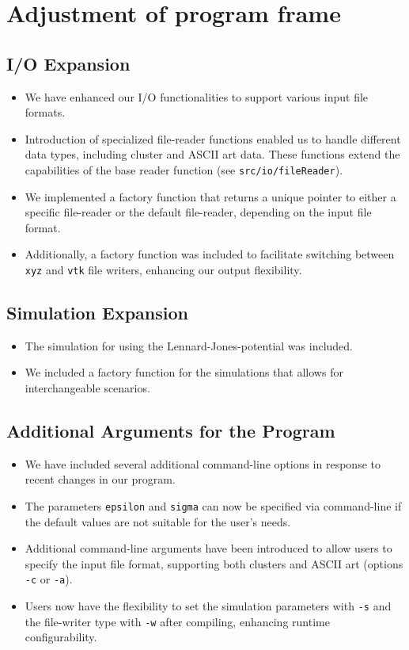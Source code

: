 \documentclass{article}
\begin{document}
\section{Adjustment of program frame}
\label{sec:adj}

\subsection{I/O Expansion}
\label{subsec:file}

\begin{itemize}
    \item We have enhanced our I/O functionalities to support various input file formats.
    \item Introduction of specialized file-reader functions enabled us to handle different data types, including cluster and ASCII art data. These functions extend the capabilities of the base reader function (see \texttt{src/io/fileReader}).
    \item We implemented a factory function that returns a unique pointer to either a specific file-reader or the default file-reader, depending on the input file format.
    \item Additionally, a factory function was included to facilitate switching between \texttt{xyz} and \texttt{vtk} file writers, enhancing our output flexibility.
\end{itemize}

\subsection{Simulation Expansion}
\label{subsec:sim}

\begin{itemize}
    \item The simulation for using the Lennard-Jones-potential was included.
    \item We included a factory function for the simulations that allows for interchangeable scenarios.
\end{itemize}

\subsection{Additional Arguments for the Program}
\label{subsec:arg}

\begin{itemize}
    \item We have included several additional command-line options in response to recent changes in our program.
    \item The parameters \texttt{epsilon} and \texttt{sigma} can now be specified via command-line if the default values are not suitable for the user's needs.
    \item Additional command-line arguments have been introduced to allow users to specify the input file format, supporting both clusters and ASCII art (options \texttt{-c} or \texttt{-a}).
    \item Users now have the flexibility to set the simulation parameters with \texttt{-s} and the file-writer type with \texttt{-w} after compiling, enhancing runtime configurability.
\end{itemize}
\end{document}
